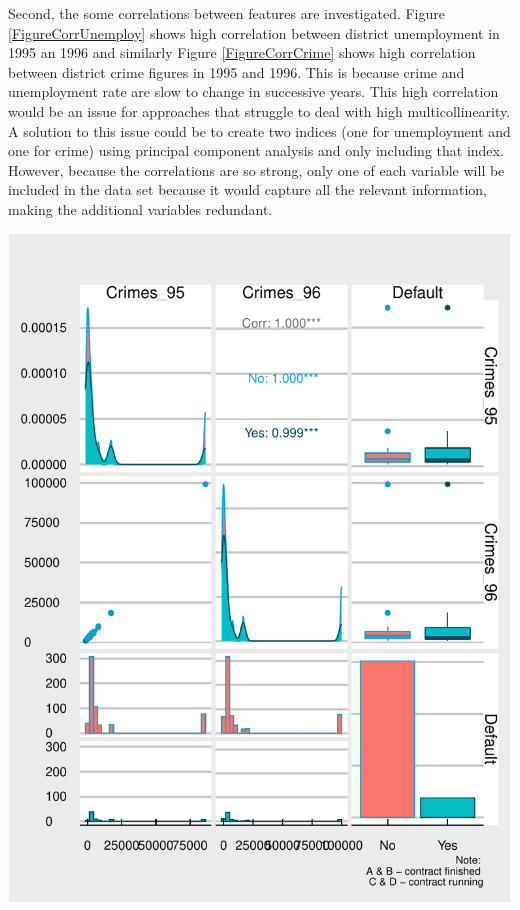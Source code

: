 \documentclass[11pt,preprint, authoryear]{elsarticle}
\let\origfigure\figure
\let\endorigfigure\endfigure
\renewenvironment{figure}[1][2] {
    \expandafter\origfigure\expandafter[H]
} {
    \endorigfigure
}
\numberwithin{equation}{section}
\numberwithin{figure}{section}
\numberwithin{table}{section}
\begin{document}
Second, the some correlations between features are investigated. Figure
\ref{FigureCorrUnemploy} shows high correlation between district
unemployment in 1995 an 1996 and similarly Figure \ref{FigureCorrCrime}
shows high correlation between district crime figures in 1995 and 1996.
This is because crime and unemployment rate are slow to change in
successive years. This high correlation would be an issue for approaches
that struggle to deal with high multicollinearity. A solution to this
issue could be to create two indices (one for unemployment and one for
crime) using principal component analysis and only including that index.
However, because the correlations are so strong, only one of each
variable will be included in the data set because it would capture all
the relevant information, making the additional variables redundant.

\begin{figure}[H]

{\centering \includegraphics{DS-Report-20065124_files/figure-latex/FigureCorrCrime-1} 

}

\caption{Correlation Between Unemployment in 1995 and 1996  \label{FigureCrime}}\label{fig:FigureCorrCrime}
\end{figure}
\end{document}
